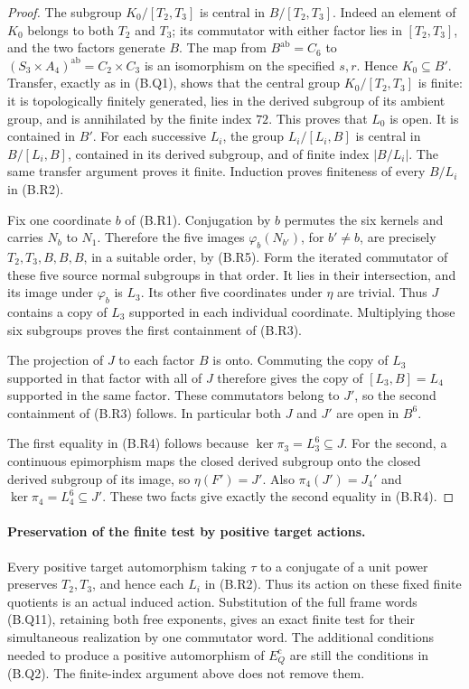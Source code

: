 \begin{proof}
The subgroup $K_0/[T_2,T_3]$ is central in
$B/[T_2,T_3]$.  Indeed an element of $K_0$ belongs to
both $T_2$ and $T_3$; its commutator with either factor
lies in $[T_2,T_3]$, and the two factors generate $B$.
The map from $B^{\mathrm{ab}}=C_6$ to
$(S_3\times A_4)^{\mathrm{ab}}=C_2\times C_3$ is an
isomorphism on the specified $s,r$.  Hence $K_0\subseteq B'$.
Transfer, exactly as in (B.Q1), shows that the central group
$K_0/[T_2,T_3]$ is finite: it is topologically finitely
generated, lies in the derived subgroup of its ambient
group, and is annihilated by the finite index $72$.
This proves that $L_0$ is open.  It is contained in $B'$.
For each successive $L_i$, the group
$L_i/[L_i,B]$ is central in $B/[L_i,B]$, contained in its
derived subgroup, and of finite index $|B/L_i|$.  The same
transfer argument proves it finite.  Induction proves
finiteness of every $B/L_i$ in (B.R2).

Fix one coordinate $b$ of (B.R1).  Conjugation by $b$
permutes the six kernels and carries $N_b$ to $N_1$.
Therefore the five images $\varphi_b(N_{b'})$, for
$b'\ne b$, are precisely $T_2,T_3,B,B,B$, in a suitable
order, by (B.R5).  Form the iterated commutator of these
five source normal subgroups in that order.  It lies in
their intersection, and its image under $\varphi_b$ is
$L_3$.  Its other five coordinates under $\eta$ are
trivial.  Thus $J$ contains a copy of $L_3$ supported in
each individual coordinate.  Multiplying those six
subgroups proves the first containment of (B.R3).

The projection of $J$ to each factor $B$ is onto.  Commuting
the copy of $L_3$ supported in that factor with all of $J$
therefore gives the copy of $[L_3,B]=L_4$ supported in the
same factor.  These commutators belong to $J'$, so the
second containment of (B.R3) follows.  In particular both
$J$ and $J'$ are open in $B^6$.

The first equality in (B.R4) follows because
$\ker\pi_3=L_3^6\subseteq J$.  For the second, a continuous
epimorphism maps the closed derived subgroup onto the
closed derived subgroup of its image, so $\eta(F')=J'$.
Also $\pi_4(J')=J_4'$ and
$\ker\pi_4=L_4^6\subseteq J'$.  These two facts give
exactly the second equality in (B.R4).
\end{proof}

\paragraph{Preservation of the finite test by positive target actions.}
Every positive target automorphism taking $\tau$ to a
conjugate of a unit power preserves $T_2,T_3$, and hence
each $L_i$ in (B.R2).  Thus its action on these fixed finite
quotients is an actual induced action.  Substitution of the
full frame words (B.Q11), retaining both free exponents,
gives an exact finite test for their simultaneous realization
by one commutator word.  The additional conditions needed
to produce a positive automorphism of $E_Q^{\mathrm c}$
are still the conditions in (B.Q2).  The finite-index
argument above does not remove them.
